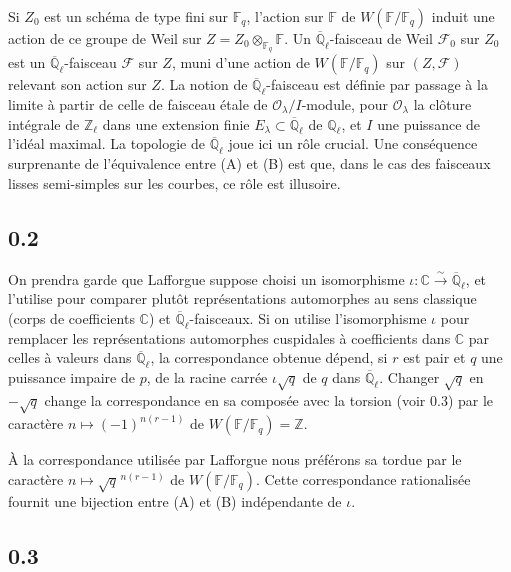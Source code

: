 \documentclass[11pt,a4paper]{article}
\theoremstyle{plain}
\theoremstyle{definition}
\begin{document}
Si $Z_0$ est un sch\'ema de type fini sur $\mathbb{F}_q$, l'action sur $\mathbb{F}$ de $W(\mathbb{F}/\mathbb{F}_q)$ induit une action de ce groupe de Weil sur $Z = Z_0 \otimes_{\mathbb{F}_q} \mathbb{F}$. Un $\overline{\mathbb{Q}}_\ell$-faisceau de Weil $\mathcal{F}_0$ sur $Z_0$ est un $\overline{\mathbb{Q}}_\ell$-faisceau $\mathcal{F}$ sur $Z$, muni d'une action de $W(\mathbb{F}/\mathbb{F}_q)$ sur $(Z,\mathcal{F})$ relevant son action sur $Z$. La notion de $\overline{\mathbb{Q}}_\ell$-faisceau est d\'efinie par passage \`a la limite \`a partir de celle de faisceau \'etale de $\mathcal{O}_\lambda/I$-module, pour $\mathcal{O}_\lambda$ la cl\^oture int\'egrale de $\mathbb{Z}_\ell$ dans une extension finie $E_\lambda \subset \overline{\mathbb{Q}}_\ell$ de $\mathbb{Q}_\ell$, et $I$ une puissance de l'id\'eal maximal. La topologie de $\overline{\mathbb{Q}}_\ell$ joue ici un r\^ole crucial. Une cons\'equence surprenante de l'\'equivalence entre (A) et (B) est que, dans le cas des faisceaux lisses semi-simples sur les courbes, ce r\^ole est illusoire.

\subsection*{0.2}

On prendra garde que Lafforgue suppose choisi un isomorphisme $\iota: \mathbb{C} \xrightarrow{\sim} \overline{\mathbb{Q}}_\ell$, et l'utilise pour comparer plut\^ot repr\'esentations automorphes au sens classique (corps de coefficients $\mathbb{C}$) et $\overline{\mathbb{Q}}_\ell$-faisceaux. Si on utilise l'isomorphisme $\iota$ pour remplacer les repr\'esentations automorphes cuspidales \`a coefficients dans $\mathbb{C}$ par celles \`a valeurs dans $\overline{\mathbb{Q}}_\ell$, la correspondance obtenue d\'epend, si $r$ est pair et $q$ une puissance impaire de $p$, de la racine carr\'ee $\iota\sqrt{q}$ de $q$ dans $\overline{\mathbb{Q}}_\ell$. Changer $\sqrt{q}$ en $-\sqrt{q}$ change la correspondance en sa compos\'ee avec la torsion (voir 0.3) par le caract\`ere $n \mapsto (-1)^{n(r-1)}$ de $W(\mathbb{F}/\mathbb{F}_q) = \mathbb{Z}$.

\`A la correspondance utilis\'ee par Lafforgue nous pr\'ef\'erons sa tordue par le caract\`ere $n \mapsto \sqrt{q}^{\,n(r-1)}$ de $W(\mathbb{F}/\mathbb{F}_q)$. Cette correspondance rationalis\'ee fournit une bijection entre (A) et (B) ind\'ependante de $\iota$.

\subsection*{0.3}
\end{document}
